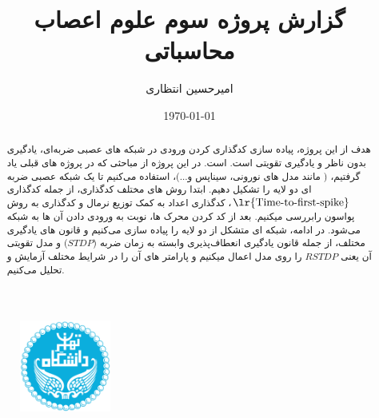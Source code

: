 \documentclass{report}
\title{گزارش پروژه سوم علوم اعصاب محاسباتی}
\author{امیرحسین انتظاری}
\date{\today}
\begin{document}
\begin{figure}
    \centering \includegraphics[height=3cm]{images/Logo.png}
\end{figure}

\newpage
\maketitle
\newpage
\tableofcontents

    \begin{abstract}
        هدف از این پروژه، پیاده سازی کدگذاری کردن ورودی در شبکه های عصبی ضربه‌ای، یادگیری بدون ناظر و یادگیری تقویتی است.
        است. در این پروژه از مباحثی که در پروژه های قبلی یاد گرفتیم،
        ( مانند مدل های نورونی، سیناپس و...)، 
        استفاده می‌کنیم تا یک شبکه عصبی ضربه ای دو لایه را تشکیل دهیم. ابتدا روش های مختلف کدگذاری، از جمله کدگذاری 
        $\text{\lr{Time-to-first-spike}}$، 
        کدگذاری اعداد به کمک توزیع نرمال و کدگذاری به روش پواسون رابررسی میکنیم. بعد از کد کردن محرک ها، نوبت به ورودی دادن آن ها به شبکه می‌شود. در ادامه، شبکه ای متشکل از دو لایه را پیاده سازی می‌کنیم و قانون های یادگیری مختلف، از جمله قانون یادگیری انعطاف‌پذیری وابسته به زمان ضربه 
        ($STDP$) 
        و مدل تقویتی آن یعنی 
        $RSTDP$ 
        را روی مدل اعمال میکنیم و پارامتر های آن را در شرایط مختلف آزمایش و تحلیل می‌کنیم.
    \end{abstract}
\restoregeometry


\newpage

\newpage



\end{document}
